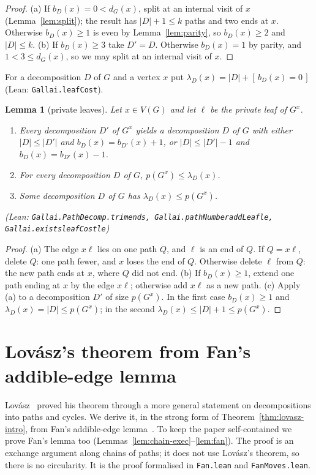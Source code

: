 \documentclass[11pt]{amsart}
\newtheorem{lemma}[theorem]{Lemma}
\theoremstyle{definition}
\theoremstyle{remark}
\renewcommand{\_}{\oldunderscore\allowbreak}
\newcommand{\lean}[1]{\textup{(Lean: {\small\texttt{#1}})}}
\newcommand{\leanst}[1]{\par{\raggedright\small\textup{(Lean: \texttt{#1})}\par}}
\newcommand{\ind}[1]{[\,#1\,]}
\begin{document}
\begin{proof}
(a) If $b_D(x)=0<d_G(x)$, split at an internal visit of $x$ (Lemma~\ref{lem:split}); the result has
$|D|+1\le k$ paths and two ends at $x$. Otherwise $b_D(x)\ge1$ is even by Lemma~\ref{lem:parity},
so $b_D(x)\ge2$ and $|D|\le k$. (b) If $b_D(x)\ge3$ take $D'=D$. Otherwise $b_D(x)=1$ by parity, and
$1<3\le d_G(x)$, so we may split at an internal visit of $x$.
\end{proof}

For a decomposition $D$ of $G$ and a vertex $x$ put $\lambda_D(x)=|D|+\ind{b_D(x)=0}$
\lean{Gallai.leafCost}.

\begin{lemma}[private leaves]\label{lem:leaf}
Let $x\in V(G)$ and let $\ell$ be the private leaf of $G^x$.
\begin{enumerate}[label=\textup{(\alph*)}]
\item Every decomposition $D'$ of $G^x$ yields a decomposition $D$ of $G$ with either
$|D|\le|D'|$ and $b_D(x)=b_{D'}(x)+1$, or $|D|\le|D'|-1$ and $b_D(x)=b_{D'}(x)-1$.
\item For every decomposition $D$ of $G$, $p(G^x)\le\lambda_D(x)$.
\item Some decomposition $D$ of $G$ has $\lambda_D(x)\le p(G^x)$.
\end{enumerate}
\leanst{Gallai.PathDecomp.trim\_ends, Gallai.pathNumber\_addLeaf\_le, Gallai.exists\_leafCost\_le}
\end{lemma}

\begin{proof}
(a) The edge $x\ell$ lies on one path $Q$, and $\ell$ is an end of $Q$. If $Q=x\ell$, delete $Q$:
one path fewer, and $x$ loses the end of $Q$. Otherwise delete $\ell$ from $Q$: the new path ends at
$x$, where $Q$ did not end. (b) If $b_D(x)\ge1$, extend one path ending at $x$ by the edge $x\ell$;
otherwise add $x\ell$ as a new path. (c) Apply (a) to a decomposition $D'$ of size $p(G^x)$. In the
first case $b_D(x)\ge1$ and $\lambda_D(x)=|D|\le p(G^x)$; in the second
$\lambda_D(x)\le|D|+1\le p(G^x)$.
\end{proof}

\section{Lov\'asz's theorem from Fan's addible-edge lemma}\label{sec:lovasz}

Lov\'asz~\cite{L68} proved his theorem through a more general statement on decompositions into
paths and cycles. We derive it, in the strong form of Theorem~\ref{thm:lovasz-intro}, from Fan's
addible-edge lemma~\cite[Lemma~3.4]{Fan05}. To keep the paper self-contained we prove Fan's lemma
too (Lemmas~\ref{lem:chain-exec}--\ref{lem:fan}). The proof is an exchange argument along chains of
paths; it does not use Lov\'asz's theorem, so there is no circularity. It is the proof formalised in
\texttt{Fan.lean} and \texttt{FanMoves.lean}.
\end{document}
